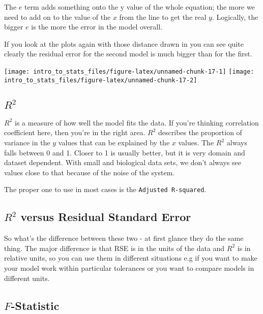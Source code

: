 \documentclass[]{book}
\begin{document}
The \(e\) term adds something onto the y value of the whole equation; the more we need to add on to the value of the \(x\) from the line to get the real \(y\). Logically, the bigger \(e\) is the more the error in the model overall.

If you look at the plots again with those distance drawn in you can see quite clearly the residual error for the second model is much bigger than for the first.

\texttt{[image: intro\_to\_stats\_files/figure-latex/unnamed-chunk-17-1]} \texttt{[image: intro\_to\_stats\_files/figure-latex/unnamed-chunk-17-2]}

\hypertarget{r2}{%
\subsection{\texorpdfstring{\(R^2\)}{R\^{}2}}\label{r2}}

\(R^2\) is a measure of how well the model fits the data. If you're thinking correlation coefficient here, then you're in the right area. \(R^2\) describes the proportion of variance in the \(y\) values that can be explained by the \(x\) values. The \(R^2\) always falls between 0 and 1. Closer to 1 is usually better, but it is very domain and dataset dependent. With small and biological data sets, we don't always see values close to that because of the noise of the system.

The proper one to use in most cases is the \texttt{Adjusted\ R-squared}.

\hypertarget{r2-versus-residual-standard-error}{%
\subsection{\texorpdfstring{\(R^2\) versus Residual Standard Error}{R\^{}2 versus Residual Standard Error}}\label{r2-versus-residual-standard-error}}

So what's the difference between these two - at first glance they do the same thing. The major difference is that RSE is in the units of the data and \(R^2\) is in relative units, so you can use them in different situations e.g if you want to make your model work within particular tolerances or you want to compare models in different units.

\hypertarget{f-statistic}{%
\subsection{\texorpdfstring{\(F\)-Statistic}{F-Statistic}}\label{f-statistic}}
\end{document}
